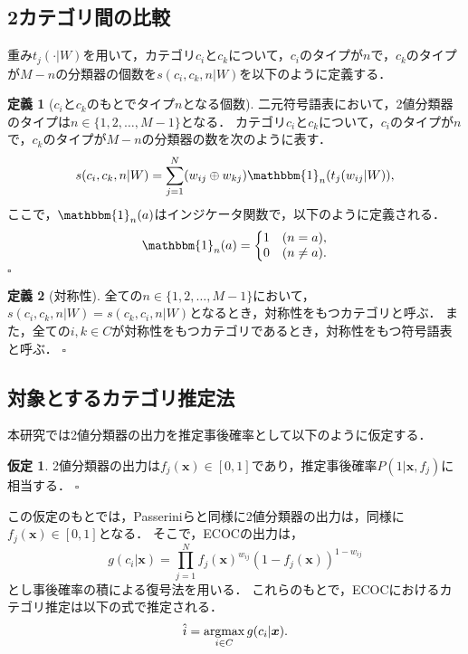 \documentclass{jarticle}
\theoremstyle{definition}
\newtheorem{definition}{定義}
\newtheorem{assumption}{仮定}
\def\QED{\hfill$\square$}
\newcommand{\argmax}{\mathop{\rm argmax}\limits}
\begin{document}
\subsection{2カテゴリ間の比較}
重み$t_{j}(\cdot|W)$を用いて，カテゴリ$c_i$と$c_k$について，$c_i$のタイプが$n$で，$c_k$のタイプが$M-n$の分類器の個数を$s(c_i,c_k,n|W)$を以下のように定義する．
\begin{definition}[$c_i$と$c_k$のもとでタイプ$n$となる個数]\label{def:nvR_d_H}
二元符号語表において，2値分類器のタイプは$n \in \{1, 2, \ldots, M-1\}$となる．
カテゴリ$c_i$と$c_k$について，$c_i$のタイプが$n$で，$c_k$のタイプが$M-n$の分類器の数を次のように表す．
\begin{align}\label{eq:s(c_i,c_k,n|W)}
    s(c_i,c_k,n|W) = \sum_{j = 1}^N (w_{ij} \oplus w_{kj}) \mathbbm{1}_n(t_{j}(w_{ij}|W)),
\end{align}
ここで，$\mathbbm{1}_n(a)$はインジケータ関数で，以下のように定義される．
  \begin{equation}
  \mathbbm{1}_n(a)=\left\{\begin{matrix}
    1\quad(n = a),\\
    0\quad(n \neq a).
  \end{matrix}\right.
  \end{equation}
\QED \end{definition} 

\begin{definition}[対称性]\label{def:Symmetric}
全ての$n \in \{1,2,\ldots,M-1\}$において，$s(c_i,c_k,n|W) = s(c_k,c_i,n|W)$となるとき，対称性をもつカテゴリと呼ぶ．
また，全ての$i,k\in C$が対称性をもつカテゴリであるとき，対称性をもつ符号語表と呼ぶ．
\QED \end{definition} 

\subsection{対象とするカテゴリ推定法}
本研究では2値分類器の出力を推定事後確率として以下のように仮定する．
\begin{assumption}\label{ass:ECOC_推定事後確率}
2値分類器の出力は$f_j(\bm{x})\in [0,1]$であり，推定事後確率$P(1|\bm{x},f_j)$に相当する．
\QED \end{assumption} 
この仮定のもとでは，Passeriniら\cite{Passerini2004-ec}と同様に2値分類器の出力は，同様に$f_j(\bm{x})\in[0,1]$となる．
そこで，ECOCの出力は，
\begin{equation}\label{eq:Passerini}
g(c_i|\bm{x}) = \prod_{j = 1}^N f_j(\bm{x})^{w_{ij}}(1-f_j(\bm{x}))^{1 - w_{ij}}
\end{equation}
とし事後確率の積による復号法を用いる．
これらのもとで，ECOCにおけるカテゴリ推定は以下の式で推定される．
 \begin{equation}\label{eq:ecoc_カテゴリ推定}
    \hat{i}= \argmax_{i \in C} g(c_i|\bm{x}).
\end{equation}
\end{document}
